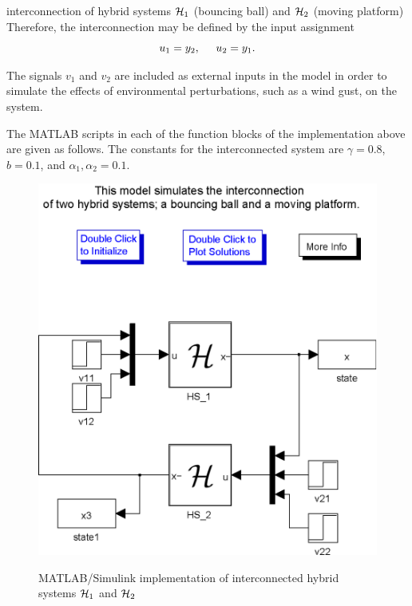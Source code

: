 \begin{example}{interconnection of hybrid systems $\mathcal{H}_1$ (bouncing ball) and $\mathcal{H}_2$ (moving platform)}
Therefore, the interconnection may be defined by the input assignment
\begin{equation}
u_1 = y_2,   \hspace{5mm}     u_2 = y_1.
\end{equation}

The signals $v_1$  and $v_2$ are included as external inputs in the model in order to simulate the effects of environmental perturbations, such as a wind gust, on the system.

The MATLAB scripts in each of the function blocks of the implementation above are given as follows. The constants for
the interconnected system are $\gamma = 0.8$, $b=0.1$, and $\alpha_1, \alpha_2=0.1$.

\begin{figure}[ht!]
  \begin{center}
    {\includegraphics[width=.6\textwidth]{figures/Simulink/InterconnectionMdl.eps}}
   \caption{MATLAB/Simulink implementation of interconnected hybrid systems $\mathcal{H}_1$ and
$\mathcal{H}_2$}
\label{fig:interconnection-1}
  \end{center}
\end{figure}


\end{example}
